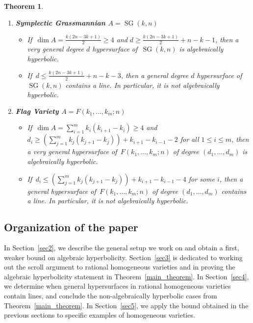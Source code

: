 \documentclass[11pt]{amsart}
\numberwithin{equation}{section}
\newtheorem{theorem}{Theorem}[section]
\theoremstyle{definition}
\theoremstyle{remark}
\DeclareMathOperator{\SG}{SG}
\begin{document}
{\begin{theorem}
\begin{enumerate}[itemsep=8pt]
        \item \textbf{Symplectic Grassmannian $A=\SG(k,n)$}
        \begin{itemize}[itemsep = 4pt]
            \item If\, $\dim A=\frac{k(2n-3k+1)}{2}\ge 4$ and $d\ge \frac{k(2n-3k+1)}{2}+n-k-1$, then a very general degree $d$ hypersurface of\, $\SG(k,n)$ is algebraically hyperbolic.

            \item If\, $d\le \frac{k(2n-3k+1)}{2}+n-k-3$, then a general degree $d$ hypersurface of\, $\SG(k,n)$ contains a line. In particular, it is not algebraically hyperbolic.
        \end{itemize}
        
        \item \textbf{Flag Variety $A=F(k_1, \hdots, k_m; n)$}
        \begin{itemize}[itemsep = 4pt]
            \item If\, $\dim A = \sum_{i=1}^{m}k_{i}(k_{i+1}-k_i)\ge 4$ and $d_{i}\ge \left (\sum_{j=1}^{m}k_{j}(k_{j+1}-k_j)\right ) + k_{i+1} - k_{i-1} - 2$ for all $1\le i\le m$, then a very general hypersurface of\, $F(k_1, \hdots, k_m; n)$ of degree $(d_1, \hdots, d_m)$ is algebraically hyperbolic.

            \item If\, $d_{i}\le \left (\sum_{j=1}^{m}k_{j}(k_{j+1}-k_j)\right ) + k_{i+1} - k_{i-1} - 4$ for some $i$, then a general hypersurface of\, $F(k_1, \hdots, k_m; n)$ of degree $(d_1, \hdots, d_m)$ contains a line. In particular, it is not algebraically hyperbolic.
        \end{itemize}
        
    \end{enumerate}
    
\end{theorem}
}

\subsection*{Organization of the paper} In Section~\ref{sec2}, we describe the general setup we work on and obtain a first, weaker bound on algebraic hyperbolicity. Section~\ref{sec3} is dedicated to working out the scroll argument to rational homogeneous varieties and in proving the algebraic hyperbolicity statement in Theorem~\ref{main_theorem}. In Section~\ref{sec4}, we determine when general hypersurfaces in rational homogeneous varieties contain lines, and conclude the non-algebraically hyperbolic cases from Theorem~\ref{main_theorem}. In Section~\ref{sec5}, we apply the bound obtained in the previous sections to specific examples of homogeneous varieties.
\end{document}
